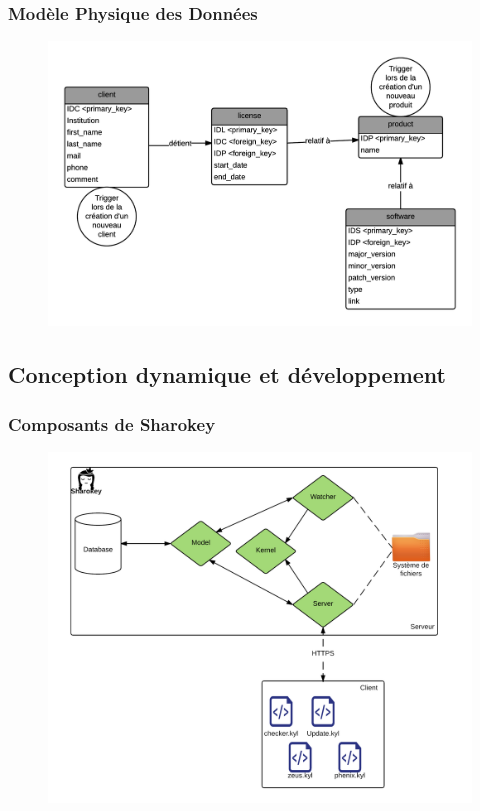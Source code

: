 \documentclass{beamer}
\begin{document}
\begin{frame}
\frametitle{Modèle Physique des Données}
\begin{figure}
\centering
\includegraphics[scale=0.6]{images/MPD_sharokey.png}
\end{figure}
\end{frame}
\subsection{Conception dynamique et développement}
\begin{frame}
\frametitle{Composants de Sharokey}
\begin{figure}
\centering
\includegraphics[scale=0.5]{images/composants.png}
\end{figure}
\end{frame}
\end{document}
